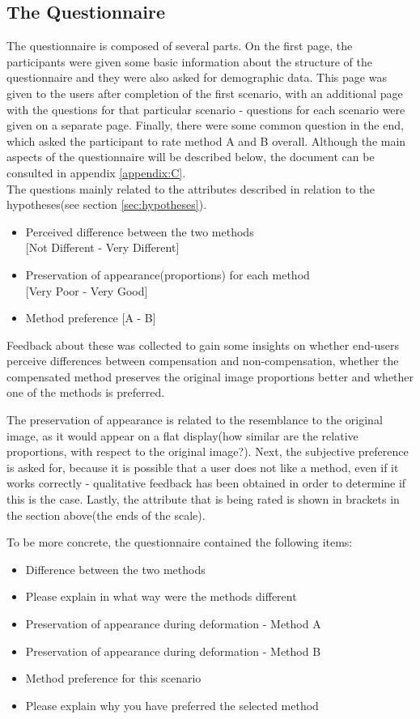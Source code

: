 \documentclass[]{article}
\begin{document}
\subsection{The Questionnaire}

The questionnaire is composed of several parts. On the first page, the participants were given some basic information about the structure of the questionnaire and they were also asked for demographic data. This page was given to the users after completion of the first scenario, with an additional page with the questions for that particular scenario - questions for each scenario were given on a separate page. Finally, there were some common question in the end, which asked the participant to rate method A and B overall. Although the main aspects of the questionnaire will be described below, the document can be consulted in appendix \ref{appendix:C}.\\

The questions mainly related to the attributes described in relation to the hypotheses(see section \ref{sec:hypotheses}).
\begin{itemize}
\item Perceived difference between the two methods \\{[Not Different - Very Different]}
\item Preservation of appearance(proportions) for each method \\{[Very Poor - Very Good]}
\item Method preference [A - B]
\end{itemize}
Feedback about these was collected to gain some insights on whether end-users perceive differences between compensation and non-compensation, whether the compensated method preserves the original image proportions better and whether one of the methods is preferred.

The preservation of appearance is related to the resemblance to the original image, as it would appear on a flat display(how similar are the relative proportions, with respect to the original image?). Next, the subjective preference is asked for, because it is possible that a user does not like a method, even if it works correctly - qualitative feedback has been obtained in order to determine if this is the case. Lastly, the attribute that is being rated is shown in brackets in the section above(the ends of the scale).

To be more concrete, the questionnaire contained the following items:
\begin{itemize}
\item Difference between the two methods
\item Please explain in what way were the methods different
\item Preservation of appearance during deformation - Method A
\item Preservation of appearance during deformation - Method B
\item Method preference for this scenario
\item Please explain why you have preferred the selected method
\end{itemize}
\end{document}
